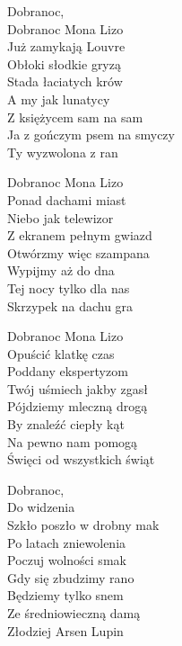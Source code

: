 \begin{text}
    Dobranoc,\\
    Dobranoc Mona Lizo\\
    Już zamykają Louvre\\
    Obłoki słodkie gryzą\\
    Stada łaciatych krów\\
    A my jak lunatycy\\
    Z księżycem sam na sam\\
    Ja z gończym psem na smyczy\\
    Ty wyzwolona z ran

    Dobranoc Mona Lizo\\
    Ponad dachami miast\\
    Niebo jak telewizor\\
    Z ekranem pełnym gwiazd\\
    Otwórzmy więc szampana\\
    Wypijmy aż do dna\\
    Tej nocy tylko dla nas\\
    Skrzypek na dachu gra

    Dobranoc Mona Lizo\\
    Opuścić klatkę czas\\
    Poddany ekspertyzom\\
    Twój uśmiech jakby zgasł\\
    Pójdziemy mleczną drogą\\
    By znaleźć ciepły kąt\\
    Na pewno nam pomogą\\
    Święci od wszystkich świąt

    Dobranoc,\\
    Do widzenia\\
    Szkło poszło w drobny mak\\
    Po latach zniewolenia\\
    Poczuj wolności smak\\
    Gdy się zbudzimy rano\\
    Będziemy tylko snem\\
    Ze średniowieczną damą\\
    Złodziej Arsen Lupin
\end{text}
\begin{chord}

\end{chord}